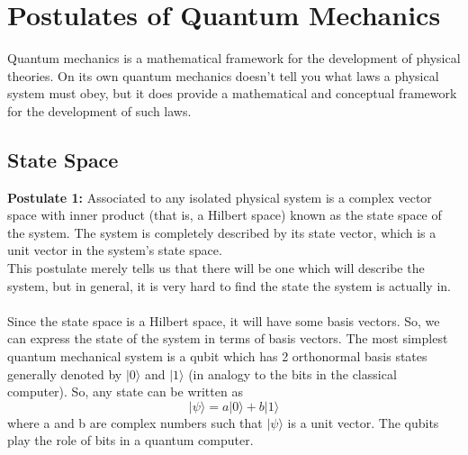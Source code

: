 \section{Postulates of Quantum Mechanics}
Quantum mechanics is a mathematical framework for the development of physical theories. On its own quantum mechanics doesn’t tell you what laws a physical system must obey, but it does provide a mathematical and conceptual framework for the development of such laws.
\subsection{State Space}
{\bf Postulate 1: }Associated to any isolated physical system is a complex vector space with inner product (that is, a Hilbert space) known as the state space of the system. The system is completely described by its state vector, which is a unit vector in the system’s state space.\\
This postulate merely tells us that there will be one which will describe the system, but in general, it is very hard to find the state the system is actually in.\\\\
Since the state space is a Hilbert space, it will have some basis vectors. So, we can express the state of the system in terms of basis vectors. The most simplest quantum mechanical system is a qubit which has 2 orthonormal basis states generally denoted by {$|0\rangle$} and $|1\rangle$ (in analogy to the bits in the classical computer). So, any state can be written as
\begin{equation}
|\psi \rangle =  a|0\rangle + b |1\rangle
\end{equation}where a and b are complex numbers such that $|\psi \rangle $ is a unit vector. The qubits play the role of bits in a quantum computer. \\

